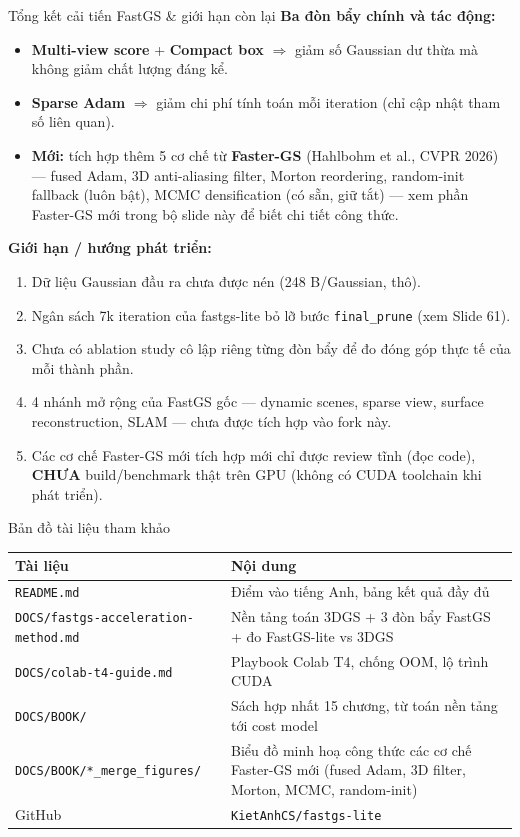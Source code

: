 \begin{frame}{Tổng kết cải tiến FastGS \& giới hạn còn lại}
\textbf{Ba đòn bẩy chính và tác động:}
\begin{itemize}
    \item \textbf{Multi-view score} + \textbf{Compact box} $\Rightarrow$ giảm số Gaussian dư thừa mà không giảm chất lượng đáng kể.
    \item \textbf{Sparse Adam} $\Rightarrow$ giảm chi phí tính toán mỗi iteration (chỉ cập nhật tham số liên quan).
    \item \textbf{Mới:} tích hợp thêm 5 cơ chế từ \textbf{Faster-GS} (Hahlbohm et al., CVPR 2026) — fused Adam, 3D anti-aliasing filter, Morton reordering, random-init fallback (luôn bật), MCMC densification (có sẵn, giữ tắt) — xem phần Faster-GS mới trong bộ slide này để biết chi tiết công thức.
\end{itemize}
\vspace{2mm}
\textbf{Giới hạn / hướng phát triển:}
\begin{enumerate}
    \item Dữ liệu Gaussian đầu ra chưa được nén (248 B/Gaussian, thô).
    \item Ngân sách 7k iteration của fastgs-lite bỏ lỡ bước \texttt{final\_prune} (xem Slide 61).
    \item Chưa có ablation study cô lập riêng từng đòn bẩy để đo đóng góp thực tế của mỗi thành phần.
    \item 4 nhánh mở rộng của FastGS gốc — dynamic scenes, sparse view, surface reconstruction, SLAM — chưa được tích hợp vào fork này.
    \item Các cơ chế Faster-GS mới tích hợp mới chỉ được review tĩnh (đọc code), \textbf{CHƯA} build/benchmark thật trên GPU (không có CUDA toolchain khi phát triển).
\end{enumerate}
\end{frame}

\begin{frame}{Bản đồ tài liệu tham khảo}
\footnotesize
\begin{table}[]
\centering
\begin{tabular}{p{4.2cm}p{6.5cm}}
\toprule
\textbf{Tài liệu} & \textbf{Nội dung} \\
\midrule
\texttt{README.md} & Điểm vào tiếng Anh, bảng kết quả đầy đủ \\
\texttt{DOCS/fastgs-\allowbreak acceleration-\allowbreak method.md} & Nền tảng toán 3DGS + 3 đòn bẩy FastGS + đo FastGS-lite vs 3DGS \\
\texttt{DOCS/colab-t4-guide.md} & Playbook Colab T4, chống OOM, lộ trình CUDA \\
\texttt{DOCS/BOOK/} & Sách hợp nhất 15 chương, từ toán nền tảng tới cost model \\
\texttt{DOCS/BOOK/*\_merge\_figures/} & Biểu đồ minh hoạ công thức các cơ chế Faster-GS mới (fused Adam, 3D filter, Morton, MCMC, random-init) \\
GitHub & \texttt{KietAnhCS/fastgs-lite} \\
\bottomrule
\end{tabular}
\end{table}
\end{frame}

